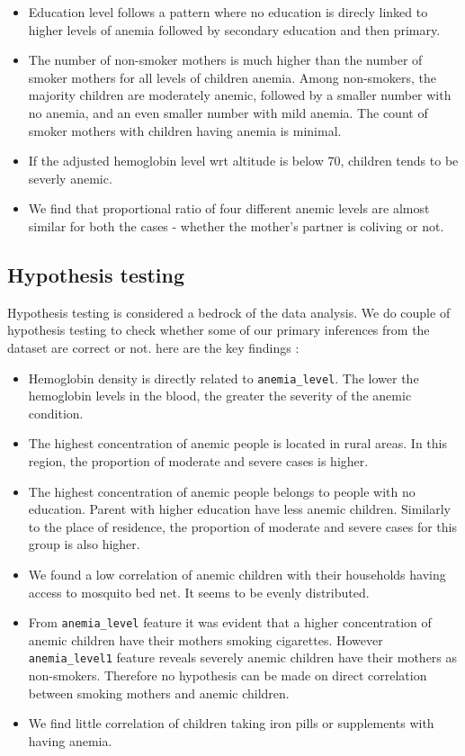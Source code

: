 \begin{itemize}
	\item Education level follows a pattern where no education is direcly linked to higher levels of anemia followed by secondary education and then primary.
	\item The number of non-smoker mothers is much higher than the number of smoker mothers for all levels of children anemia. Among non-smokers, the majority children are moderately anemic, followed by a smaller number with no anemia, and an even smaller number with mild anemia. The count of smoker mothers with children having anemia is minimal.
	\item If the adjusted hemoglobin level wrt altitude is below 70, children tends to be severly anemic.
	\item We find that proportional ratio of four different anemic levels are almost similar for both the cases - whether the mother's partner is coliving or not.
\end{itemize}




\subsection{Hypothesis testing}

Hypothesis testing is considered a bedrock of the data analysis. We do couple of hypothesis testing to check whether some of our primary inferences from the dataset are correct or not. here are the key findings :

\begin{itemize}
	\item Hemoglobin density is directly related to \texttt{anemia\_level}. The lower the hemoglobin levels in the blood, the greater the severity of the anemic condition.
	\item The highest concentration of anemic people is located in rural areas. In this region, the proportion of moderate and severe cases is higher.
	\item The highest concentration of anemic people belongs to people with no education. Parent with higher education have less anemic children. Similarly to the place of residence, the proportion of moderate and severe cases for this group is also higher.
	\item We found a low correlation of anemic children with their households having access to mosquito bed net. It seems to be evenly distributed.
	\item From \texttt{anemia\_level} feature it was evident that a higher concentration of anemic children have their mothers smoking cigarettes. However \texttt{anemia\_level1} feature reveals severely anemic children have their mothers as non-smokers. Therefore no hypothesis can be made on direct correlation between smoking mothers and anemic children.
	\item We find little correlation of children taking iron pills or supplements with having anemia.
\end{itemize}












